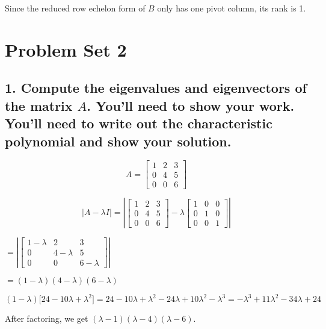 \documentclass[]{article}
\begin{document}
Since the reduced row echelon form of \(B\) only has one pivot column,
its rank is 1.

\section{Problem Set 2}\label{problem-set-2}

\subsection{\texorpdfstring{1. Compute the eigenvalues and eigenvectors
of the matrix \(A\). You'll need to show your work. You'll need to write
out the characteristic polynomial and show your
solution.}{1. Compute the eigenvalues and eigenvectors of the matrix A. You'll need to show your work. You'll need to write out the characteristic polynomial and show your solution.}}\label{compute-the-eigenvalues-and-eigenvectors-of-the-matrix-a.-youll-need-to-show-your-work.-youll-need-to-write-out-the-characteristic-polynomial-and-show-your-solution.}

\[A = \begin{bmatrix} 1 & 2 & 3\\
                     0 & 4 & 5\\
                     0 & 0 & 6
     \end{bmatrix}\]

\[|A - \lambda I | = \left | \begin{bmatrix} 1 & 2 & 3\\ 0 & 4 & 5\\0 & 0 & 6\end{bmatrix} - \lambda \begin{bmatrix}1 & 0 & 0 \\ 0 & 1 & 0\\ 0 & 0 & 1 \end{bmatrix} \right |\]

\(= \left|\begin{bmatrix}1-\lambda & 2 & 3\\ 0 & 4-\lambda & 5\\ 0 & 0 & 6-\lambda\end{bmatrix}\right|\)

\(= (1-\lambda)(4-\lambda)(6-\lambda)\)

\((1 - \lambda)\Big[24-10\lambda+\lambda^2\Big] = 24 -10\lambda + \lambda^2 -24\lambda +10\lambda^2 - \lambda^3 = -\lambda^3 + 11\lambda^2 -34\lambda + 24\)

After factoring, we get \((\lambda - 1)(\lambda - 4)(\lambda - 6)\).
\end{document}
